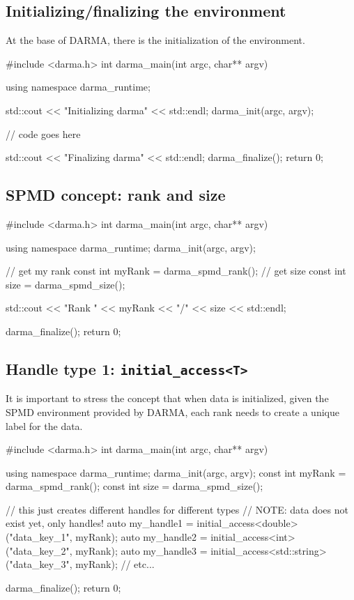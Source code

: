 \subsection{Initializing/finalizing the environment}

At the base of DARMA, there is the initialization 
of the environment.
\begin{CppCodeNumb}
#include <darma.h>
int darma_main(int argc, char** argv)
{
  using namespace darma_runtime;

  std::cout << "Initializing darma" << std::endl;
  darma_init(argc, argv);

  // code goes here

  std::cout << "Finalizing darma" << std::endl;
  darma_finalize();
  return 0;
}
\end{CppCodeNumb}





\subsection{SPMD concept: rank and size}

\begin{CppCodeNumb}
#include <darma.h>
int darma_main(int argc, char** argv)
{
  using namespace darma_runtime;
  darma_init(argc, argv);

  // get my rank
  const int myRank = darma_spmd_rank();
  // get size 
  const int size = darma_spmd_size();

  std::cout << "Rank " << myRank << "/" << size << std::endl;

  darma_finalize();
  return 0;
}
\end{CppCodeNumb}



\subsection{Handle type 1: \texttt{initial\_access<T>}}

It is important to stress the concept that when data is 
initialized, given the SPMD environment provided by DARMA, 
each rank needs to create a unique label for the data.

\begin{CppCodeNumb}
#include <darma.h>
int darma_main(int argc, char** argv)
{
  using namespace darma_runtime;
  darma_init(argc, argv);
  const int myRank = darma_spmd_rank();
  const int size = darma_spmd_size();

  // this just creates different handles for different types
  // NOTE: data does not exist yet, only handles!
  auto my_handle1 = initial_access<double>("data_key_1", myRank);
  auto my_handle2 = initial_access<int>("data_key_2", myRank);
  auto my_handle3 = initial_access<std::string>("data_key_3", myRank);
  // etc...

  darma_finalize();
  return 0;
}
\end{CppCodeNumb}




